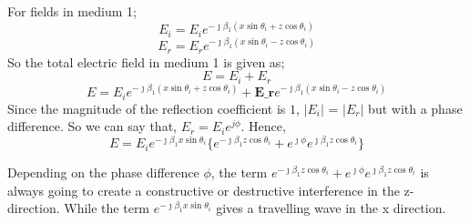For fields in medium 1;
\begin{equation}
E_i = E_i e^{- \jmath \beta_1(x\sin\theta_i + z\cos\theta_i)}
\end{equation}
\begin{equation}
E_r = E_r e^{- \jmath \beta_1(x\sin\theta_i - z\cos\theta_i)}
\end{equation}
So the total electric field in medium 1 is given as;
\begin{equation*}
E = E_i + E_r
\end{equation*}
\begin{equation*}
E =  E_i e^{- \jmath \beta_1(x\sin\theta_i + z\cos\theta_i)} + \textbf{E_r} e^{- \jmath \beta_1(x\sin\theta_i - z\cos\theta_i)}
\end{equation*}
Since the magnitude of the reflection coefficient is $1$,  $|E_{i}|$ = $|E_{r}|$ but with a phase difference. So we can say that, $E_{r} = E_{i}e^{j\phi}$.
Hence,
\begin{equation*}
E = E_i e^{- \jmath \beta_1x\sin\theta_i}\{ e^{- \jmath \beta_1z\cos\theta_i} + e^{\jmath \phi}
e^{\jmath \beta_1 z\cos\theta_i} \}
\end{equation*}

Depending on the phase difference $\phi$, the term $e^{- \jmath \beta_1z\cos\theta_i} + e^{\jmath \phi}
e^{\jmath \beta_1 z\cos\theta_i}$ is always going to create a constructive or destructive interference in the z-direction. While the term $ e^{- \jmath \beta_1x\sin\theta_i}$ gives a travelling wave in the x direction.

